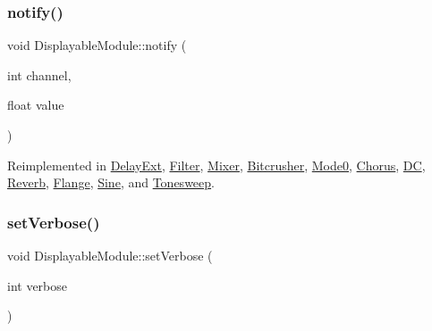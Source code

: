 \mbox{\label{class_displayable_module_a8ae5383931f10c54cff2feef2bc07dee}} 
\subsubsection{\texorpdfstring{notify()}{notify()}}
{\footnotesize\ttfamily void Displayable\+Module\+::notify (\begin{DoxyParamCaption}\item[{int}]{channel,  }\item[{float}]{value }\end{DoxyParamCaption})\hspace{0.3cm}{\ttfamily [virtual]}}



Reimplemented in \mbox{\hyperlink{class_delay_ext_a76001b2a3aad7ce1a2e1220ab7387be4}{Delay\+Ext}}, \mbox{\hyperlink{class_filter_a9cdce58ac2fe0b8beb6d561ab3725041}{Filter}}, \mbox{\hyperlink{class_mixer_a73177ee1e071909ef23ff2e913eb6cbc}{Mixer}}, \mbox{\hyperlink{class_bitcrusher_ae392ad4b140a5121df417ece060911f4}{Bitcrusher}}, \mbox{\hyperlink{class_mode0_a743ebe3d0faccc421d06c9114026a099}{Mode0}}, \mbox{\hyperlink{class_chorus_acb22e9cc93011859d1ae02b05a7388f5}{Chorus}}, \mbox{\hyperlink{class_d_c_a45e51132fbd69668134f3ab13f3668b1}{DC}}, \mbox{\hyperlink{class_reverb_a0a4818faef8203311b3c31eb9d59c277}{Reverb}}, \mbox{\hyperlink{class_flange_a10541758c108d92a73e96ed9f8f1377b}{Flange}}, \mbox{\hyperlink{class_sine_a91e8327318758647ea3e0f856eb3eb60}{Sine}}, and \mbox{\hyperlink{class_tonesweep_a26d324fb0de4aac00a04e7e7e9e812c0}{Tonesweep}}.

\mbox{\label{class_displayable_module_a3c659ed0797811970d156ce342cdb187}} 
\subsubsection{\texorpdfstring{set\+Verbose()}{setVerbose()}}
{\footnotesize\ttfamily void Displayable\+Module\+::set\+Verbose (\begin{DoxyParamCaption}\item[{int}]{verbose }\end{DoxyParamCaption})}

